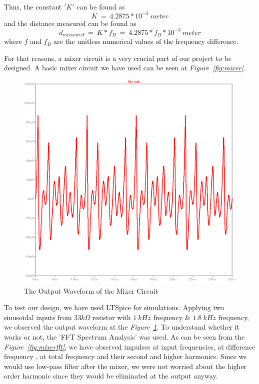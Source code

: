 \documentclass[paper]{IEEEtran}
\begin{document}
	\-\\	
	Thus, the constant $'K'$ can be found as
	$$	K~=~4.2875*10^{-3}~meter	$$	
	and the distance measured can be found as 
	$$	d_{measured}~=~K*f_B~=~4.2875*f_B*10^{-3}~meter	$$	
	where $f$ and $f_B$ are the unitless numerical values of the frequency difference.
	
	
	For that reasons, a mixer circuit is a very crucial part of our project to be designed. A basic mixer circuit we have used can be seen at \textit{Figure~\ref{fig:mixer}}.


\begin{figure}[h!]
\setlength{\unitlength}{\textwidth}
\center 
\includegraphics[width=0.45\unitlength]{mixer_op3.png}
\caption{\label{fig:mixerop} The Output Waveform of the Mixer Circuit }
\end{figure}	

	
	To test our design, we have used LTSpice for simulations. Applying two sinusoidal inputs from $33k\Omega$ resistor with $1~kHz$ frequency \& $1.8~kHz$ frequency, we observed the output waveform at the \textit{Figure~\ref{fig:mixerop}}. To understand whether it works or not, the 'FFT Spectrum Analysis' was used. As can be seen from the \textit{Figure~\ref{fig:mixerfft}}, we have observed impulses at input frequencies, at difference frequency , at total frequency and their second and higher harmonics. Since we would use low-pass filter after the mixer, we were not worried about the higher order harmonic since they would be eliminated at the output anyway. 
\end{document}
